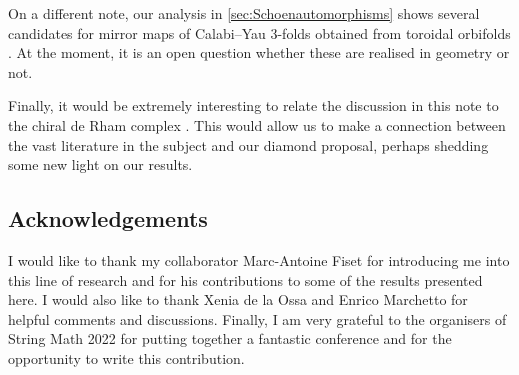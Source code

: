 \documentclass{pspum-l}
\theoremstyle{definition}
\theoremstyle{remark}
\numberwithin{equation}{section}
\begin{document}
On a different note, our analysis in \cref{sec:Schoenautomorphisms} shows several candidates for mirror maps of Calabi--Yau 3-folds obtained from toroidal orbifolds \cite{Donagi:2008xy}. At the moment, it is an open question whether these are realised in geometry or not. 

Finally, it would be extremely interesting to relate the discussion in this note to the chiral de Rham complex \cite{Malikov:1998dw}. This would allow us to make a connection between the vast literature in the subject and our diamond proposal, perhaps shedding some new light on our results.



\subsection*{Acknowledgements}

I would like to thank my collaborator Marc-Antoine Fiset for introducing me into this line of research and for his contributions to some of the results presented here. I would also like to thank Xenia de la Ossa and Enrico Marchetto for helpful comments and discussions. Finally, I am very grateful to the organisers of String Math 2022 for putting together a fantastic conference and for the opportunity to write this contribution.




\end{document}
